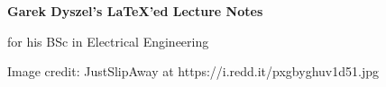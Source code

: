 \documentclass{amsart}
\begin{document}
\vspace*{\fill}

\begin{flushleft}
\Huge{\textbf{Garek Dyszel's \LaTeX'ed Lecture Notes}}
  
\Large{for his BSc in Electrical Engineering}
\end{flushleft}

\vspace*{\fill}

\tiny{Image credit: JustSlipAway at https://i.redd.it/pxgbyghuv1d51.jpg}
\end{document}
